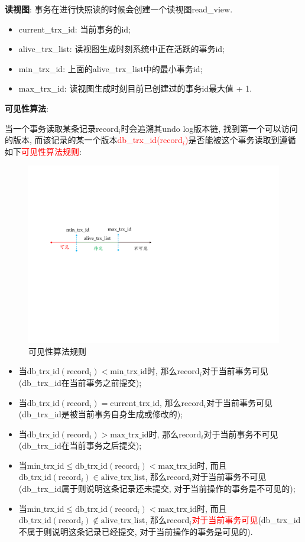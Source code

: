\textbf{读视图}: 事务在进行快照读的时候会创建一个读视图read\_view.
\begin{itemize}
  \item current\_trx\_id: 当前事务的id;
  \item alive\_trx\_list: 读视图生成时刻系统中正在活跃的事务id;
  \item min\_trx\_id: 上面的alive\_trx\_list中的最小事务id;
  \item max\_trx\_id: 读视图生成时刻目前已创建过的事务id最大值 + 1.
\end{itemize}


\textbf{可见性算法}: 

当一个事务读取某条记录$\text{record}_i$时会追溯其undo log版本链, 找到第一个可以访问的版本, 而该记录的某一个版本\textcolor{red}{db\_trx\_id($\text{record}_i$)}是否能被这个事务读取到遵循如下\textcolor{red}{可见性算法规则}:
\begin{figure}[H]
    \centering
    \includegraphics[width=.5\textwidth]{figure/可见性算法规则.pdf}
    \caption{可见性算法规则}
\end{figure}
\begin{itemize}
  \item 当$\text{db\_trx\_id}(\text{record}_i)<\text{min\_trx\_id}$时, 那么$\text{record}_i$对于当前事务可见(db\_trx\_id在当前事务之前提交);
  \item 当$\text{db\_trx\_id}(\text{record}_i)=\text{current\_trx\_id}$, 那么$\text{record}_i$对于当前事务可见(db\_trx\_id是被当前事务自身生成或修改的);
  \item 当$\text{db\_trx\_id}(\text{record}_i)>\text{max\_trx\_id}$时, 那么$\text{record}_i$对于当前事务不可见(db\_trx\_id在当前事务之后提交);
  \item 当$\text{min\_trx\_id}\leq \text{db\_trx\_id}(\text{record}_i)<\text{max\_trx\_id}$时, 而且$\text{db\_trx\_id}(\text{record}_i) \in \text{alive\_trx\_list}$, 那么$\text{record}_i$对于当前事务不可见(db\_trx\_id属于则说明这条记录还未提交, 对于当前操作的事务是不可见的);
  \item 当$\text{min\_trx\_id}\leq \text{db\_trx\_id}(\text{record}_i)<\text{max\_trx\_id}$时, 而且$\text{db\_trx\_id}(\text{record}_i) \not\in \text{alive\_trx\_list}$, 那么$\text{record}_i$\textcolor{red}{对于当前事务可见}(db\_trx\_id不属于则说明这条记录已经提交, 对于当前操作的事务是可见的).
\end{itemize}

